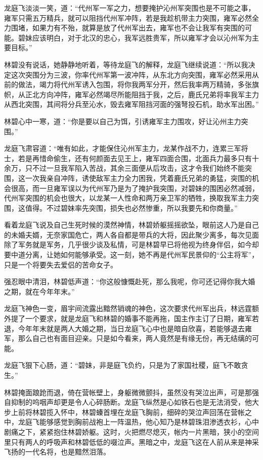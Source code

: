 龙庭飞淡淡一笑，道：“代州军一军之力，想要掩护沁州军突围也是不可能之事，雍军只需五万精兵，就可以阻挡代州军冲阵，若是我趁机带主力突围，雍军必然全力围堵，如果力有不殆，就算是放了代州军出去，雍军也不会让我军有突围的可能。碧妹应该明白，对于北汉的忠心，我军远胜贵军，所以雍军才会以沁州军为主要目标。”

林碧没有说话，她静静地听着，等待龙庭飞的解释，龙庭飞继续说道：“所以我决定这次突围分为三波，你率代州军第一波冲阵，从东北方向突围，雍军必然采用从前的做法，竭力将代州军诱入包围，将你我两军分开，然后我率两万精骑，多张旗帜，从正北方向冲阵，雍军必然竭尽所能阻挡于我，之后，鹿氏兄弟将率我军主力从西北突围，其间将分兵至沁水，毁去雍军阻挡河面的强弩投石机，助水军出困。”

林碧心中一寒，道：“你是要以自己为饵，引诱雍军主力围攻，好让沁州主力突围。”

龙庭飞肃容道：“唯有如此，才能保住沁州军主力，龙某作战不力，连累三军将士，若是再惜命偷生，还有何颜面去见王上，雍军四面合围，北面兵力最多只有十余万，只不过一旦我军陷入苦战，其余三面便从后攻击，这才令我们始终不能突围，这一次我亲自冲阵，诱使敌军主力全力困我，凭着鹿氏兄弟的勇猛，突围的机会很高，而一旦雍军误以为代州军乃是为了掩护我突围，对碧妹的围困必然减弱，代州军突围的机会也很大，以龙某一人性命和两万亲卫军的牺牲，换取我军主力突围，这值得。不过碧妹率先突围，损失也必然惨重，所以我要先和你商量。”

看着龙庭飞说及自己生死时候的漠然神情，林碧娇躯摇摇欲坠，眼前这人乃是自己的未婚夫婿，无奈家国危亡，两人各自都是带兵的大将，因此聚少离多，每次见面除了军务就是军务，几乎很少谈及私情，可是林碧早已将他视为终身伴侣，如今却要中道分离，让她如何能够承受。这一刻，她不再是代州军民景仰的“公主将军”，只是一个将要失去爱侣的苦命女子。

强忍眼中清泪，林碧低声道：“你这般慷慨赴死，那么我呢，你可还记得你我大婚之期，就在今年年末。”

龙庭飞神色一变，眉宇间流露出黯然销魂的神色，这次要求代州军出兵，林远霆额外提了一个要求，就是龙庭飞和林碧的婚事不能再拖，国主作主订了日期，雍军若退，今年年末就是两人大婚之期，当日龙庭飞心中也是暗自欣喜，若能够退去雍军，那么自己也有面目迎亲。只是如今看来，两人竟然是有缘无份，再无结缡的可能。

龙庭飞狠下心肠，道：“碧妹，非是庭飞负约，只是为了家国社稷，庭飞不敢贪生。”

林碧掩面踉跄而退，倚在营帐壁上，身躯微微颤抖，虽然没有哭泣出声，可是那强自抑制的呜咽声却更是令人心碎肠断。龙庭飞纵然是心如铁石也是无法消受，他大步上前将林碧揽入怀中，林碧螓首埋在龙庭飞胸前，细碎的哭泣声回荡在营帐之中，龙庭飞能够感觉到胸前战袍上一阵温热，他心知乃是林碧珠泪渗透衣衫，心中剧痛之下，紧紧抱住林碧娇躯。这时，火把燃尽熄灭，帐内一片黑暗，狭小的空间里只有两人的呼吸声和林碧低低的啜泣声。黑暗之中，龙庭飞这在人前从来是神采飞扬的一代名将，也是黯然泪落。

